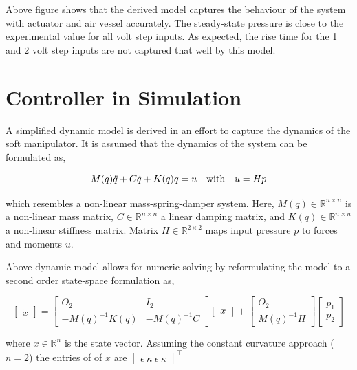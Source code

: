 Above figure shows that the derived model captures the behaviour of the system with actuator and air vessel accurately. The steady-state pressure is close to the experimental value for all volt step inputs. As expected, the rise time for the 1 and 2 volt step inputs are not captured that well by this model.



\section{Controller in Simulation}

A simplified dynamic model is derived in an effort to capture the dynamics of the soft manipulator. It is assumed that the dynamics of the system can be formulated as, 

\begin{equation}
    M(q)\Ddot{q} + C\dot{q} + K(q)q = u \hspace{10pt} \text{with} \hspace{10pt} u = Hp
\end{equation}

which resembles a non-linear mass-spring-damper system. Here, $M(q)  \in \mathbb{R}^{n\times n}$ is a non-linear mass matrix, $C   \in \mathbb{R}^{n\times n}$ a linear damping matrix, and $K(q)   \in \mathbb{R}^{n\times n}$ a non-linear stiffness matrix. Matrix $H   \in \mathbb{R}^{2\times 2}$ maps input pressure $p$ to forces and moments $u$.

Above dynamic model allows for numeric solving by reformulating the model to a second order state-space formulation as,

\begin{equation}
     \begin{bmatrix} \dot{x}  \end{bmatrix}   =      \begin{bmatrix} O_2 & I_2 \\ -M(q)^{-1}K(q)  & -M(q)^{-1} C \end{bmatrix}      \begin{bmatrix} x \end{bmatrix}  +      \begin{bmatrix} O_2 \\ M(q)^{-1}H   \end{bmatrix}       \begin{bmatrix} p_1\\ p_2   \end{bmatrix} 
\end{equation}

where $x \in \mathbb{R}^{n}$ is the state vector. Assuming the constant curvature approach ($n = 2$) the entries of of $x$ are $ \begin{bmatrix} \epsilon \hspace{3pt} \kappa \hspace{3pt} \dot{\epsilon}  \hspace{3pt} \dot{\kappa}  \end{bmatrix}^{\top}  $















